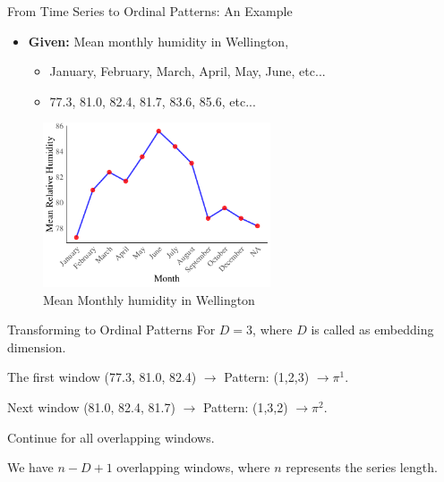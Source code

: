\documentclass{beamer}
\begin{document}
\begin{frame}{From Time Series to Ordinal Patterns: An Example}
	\begin{itemize}
		\item \textbf{Given:} Mean monthly humidity in Wellington,
		\begin{itemize}
			\item January, February, March, April, May, June, etc...
			\item 77.3, 81.0, 82.4, 81.7, 83.6, 85.6, etc... 
		\end{itemize}
	\end{itemize}
\begin{figure}[hbt]
	\centering
	\includegraphics[width=0.6\textwidth]{humidity graph}
	\caption{Mean Monthly humidity in Wellington}
	\label{fig:humidity}
\end{figure}	
	
\end{frame}

\begin{frame}{Transforming to Ordinal Patterns}
	For $D=3$, where $D$ is called as \alert{embedding dimension}.
	
	The first window (77.3, 81.0, 82.4) $\rightarrow$ Pattern: (1,2,3) $\rightarrow \pi^1$.
	
	Next window (81.0, 82.4, 81.7) $\rightarrow$ Pattern: (1,3,2) $\rightarrow \pi^2$.
	
	Continue for all overlapping windows.
	
	We have $n-D+1$ overlapping windows, where $n$ represents the series length. 
\end{frame}

\end{document}
